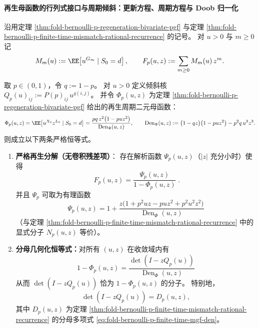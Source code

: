 \paragraph{再生母函数的行列式接口与周期倾斜：更新方程、周期方程与 Doob 归一化}
沿用定理 \ref{thm:fold-bernoulli-p-regeneration-bivariate-pgf} 与定理 \ref{thm:fold-bernoulli-p-finite-time-mismatch-rational-recurrence} 的记号。
\providecommand{\Den}{\operatorname{Den}}
对 \(u>0\) 与 \(m\ge 0\) 记
\[
M_m(u):=\EE\!\left[u^{G_m}\mid S_0=d\right],
\qquad
F_p(u,z):=\sum_{m\ge 0}M_m(u)\,z^m.
\]

\begin{theorem}\label{thm:fold-bernoulli-p-renewal-determinant-factorization}
取 \(p\in(0,1)\)，令 \(q:=1-p\)。
对 \(u>0\) 定义倾斜核
\(
Q_p(u)_{ij}:=P(p)_{ij}\,u^{g(i,j)}
\)。
并令 \(\Phi_p(u,z)\) 为定理 \ref{thm:fold-bernoulli-p-regeneration-bivariate-pgf} 给出的再生周期二元母函数：
\[
\Phi_p(u,z)=\EE\!\left[u^{X_0}z^{L_0}\mid S_0=d\right]
=\frac{p q\,z^2\bigl(1-pu z^2\bigr)}{\Den_\Phi(u,z)},
\qquad
\Den_\Phi(u,z):=\bigl(1-qz\bigr)\bigl(1-pu z^2\bigr)-p^2 q\,u^3 z^3.
\]
则成立以下两条严格恒等式。
\begin{enumerate}
  \item \textbf{严格再生分解（无卷积残差项）}：
  存在解析函数 \(\Psi_p(u,z)\)（\(|z|\) 充分小时）使得
  \begin{equation}\label{eq:fold-bernoulli-p-renewal-F-Psi-Phi}
  \boxed{\;
  F_p(u,z)=\frac{\Psi_p(u,z)}{1-\Phi_p(u,z)}\; }.
  \end{equation}
  并且 \(\Psi_p\) 可取为有理函数
  \begin{equation}\label{eq:fold-bernoulli-p-renewal-Psi-explicit}
  \boxed{\;
  \Psi_p(u,z)=1+\frac{z\bigl(1+p^2uz-puz^2+p^2u^2z^2\bigr)}{\Den_\Phi(u,z)}\;}
  \end{equation}
  （与定理 \ref{thm:fold-bernoulli-p-finite-time-mismatch-rational-recurrence} 中的显式分子 \(N_p(u,z)\) 等价）。

  \item \textbf{分母几何化恒等式：}对所有 \((u,z)\) 在收敛域内有
  \begin{equation}\label{eq:fold-bernoulli-p-renewal-den-geometrization}
  \boxed{\;
  1-\Phi_p(u,z)=\frac{\det(I-zQ_p(u))}{\Den_\Phi(u,z)}\;}
  \end{equation}
  从而 \(\det(I-zQ_p(u))\) 恰为 \(1-\Phi_p(u,z)\) 的分子。
  特别地，
  \begin{equation}\label{eq:fold-bernoulli-p-renewal-det-equals-Dp}
  \det(I-zQ_p(u))=D_p(u,z),
  \end{equation}
  其中 \(D_p(u,z)\) 为定理 \ref{thm:fold-bernoulli-p-finite-time-mismatch-rational-recurrence} 的分母多项式 \eqref{eq:fold-bernoulli-p-finite-time-mgf-den}。
\end{enumerate}
\end{theorem}
